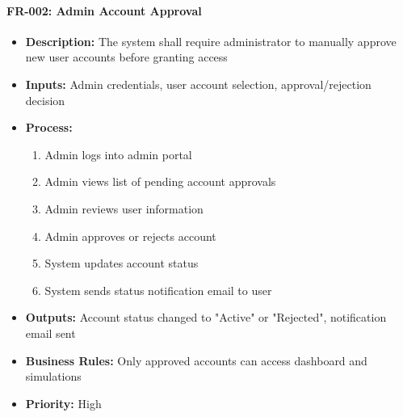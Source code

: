 \documentclass[12pt,a4paper]{article}
\begin{document}
\begin{enumerate}
\paragraph{FR-002: Admin Account Approval}
\begin{itemize}
    \item \textbf{Description:} The system shall require administrator to manually approve new user accounts before granting access
    \item \textbf{Inputs:} Admin credentials, user account selection, approval/rejection decision
    \item \textbf{Process:}
    \begin{enumerate}
        \item Admin logs into admin portal
        \item Admin views list of pending account approvals
        \item Admin reviews user information
        \item Admin approves or rejects account
        \item System updates account status
        \item System sends status notification email to user
    \end{enumerate}
    \item \textbf{Outputs:} Account status changed to "Active" or "Rejected", notification email sent
    \item \textbf{Business Rules:} Only approved accounts can access dashboard and simulations
    \item \textbf{Priority:} High
\end{itemize}


\end{enumerate}
\end{document}
